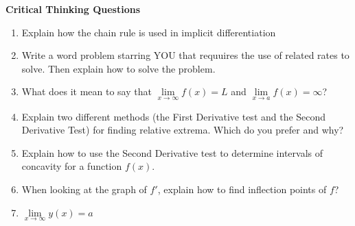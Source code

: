 \documentclass[11pt]{article}
\begin{document}
\textbf{Critical Thinking Questions}
\begin{enumerate}

    \item Explain how the chain rule is used in implicit differentiation
    \item Write a word problem starring YOU that requuires the use of related rates to solve. Then explain how to solve the problem.
    \item What does it mean to say that $\lim\limits_{x \to \infty}f(x)=L$ and $\lim\limits_{x \to a}f(x)=\infty$?
    \item Explain two different methods (the First Derivative test and the Second Derivative Test) for finding relative extrema. Which do you prefer and why?
    \item Explain how to use the Second Derivative test to determine intervals of concavity for a function $f(x)$.
    \item When looking at the graph of $f'$, explain how to find inflection points of $f$?
    \item $\lim\limits_{x \to \infty}y(x) = a$

\end{enumerate}
\end{document}
